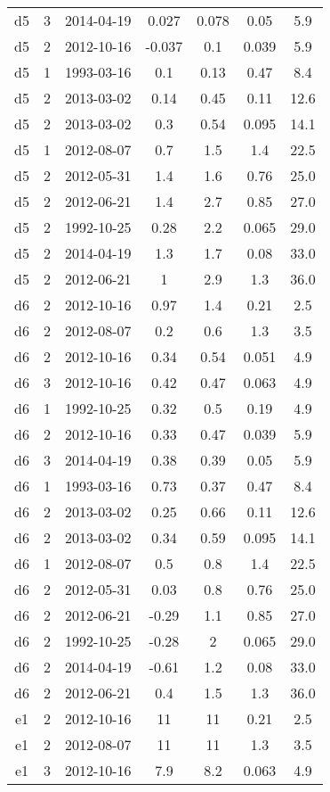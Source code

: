 \begin{table*}[htp]
\begin{tabular}{ccccccc}
d5 & 3 & 2014-04-19 & 0.027 & 0.078 & 0.05 & 5.9 \\
d5 & 2 & 2012-10-16 & -0.037 & 0.1 & 0.039 & 5.9 \\
d5 & 1 & 1993-03-16 & 0.1 & 0.13 & 0.47 & 8.4 \\
d5 & 2 & 2013-03-02 & 0.14 & 0.45 & 0.11 & 12.6 \\
d5 & 2 & 2013-03-02 & 0.3 & 0.54 & 0.095 & 14.1 \\
d5 & 1 & 2012-08-07 & 0.7 & 1.5 & 1.4 & 22.5 \\
d5 & 2 & 2012-05-31 & 1.4 & 1.6 & 0.76 & 25.0 \\
d5 & 2 & 2012-06-21 & 1.4 & 2.7 & 0.85 & 27.0 \\
d5 & 2 & 1992-10-25 & 0.28 & 2.2 & 0.065 & 29.0 \\
d5 & 2 & 2014-04-19 & 1.3 & 1.7 & 0.08 & 33.0 \\
d5 & 2 & 2012-06-21 & 1 & 2.9 & 1.3 & 36.0 \\
d6 & 2 & 2012-10-16 & 0.97 & 1.4 & 0.21 & 2.5 \\
d6 & 2 & 2012-08-07 & 0.2 & 0.6 & 1.3 & 3.5 \\
d6 & 2 & 2012-10-16 & 0.34 & 0.54 & 0.051 & 4.9 \\
d6 & 3 & 2012-10-16 & 0.42 & 0.47 & 0.063 & 4.9 \\
d6 & 1 & 1992-10-25 & 0.32 & 0.5 & 0.19 & 4.9 \\
d6 & 2 & 2012-10-16 & 0.33 & 0.47 & 0.039 & 5.9 \\
d6 & 3 & 2014-04-19 & 0.38 & 0.39 & 0.05 & 5.9 \\
d6 & 1 & 1993-03-16 & 0.73 & 0.37 & 0.47 & 8.4 \\
d6 & 2 & 2013-03-02 & 0.25 & 0.66 & 0.11 & 12.6 \\
d6 & 2 & 2013-03-02 & 0.34 & 0.59 & 0.095 & 14.1 \\
d6 & 1 & 2012-08-07 & 0.5 & 0.8 & 1.4 & 22.5 \\
d6 & 2 & 2012-05-31 & 0.03 & 0.8 & 0.76 & 25.0 \\
d6 & 2 & 2012-06-21 & -0.29 & 1.1 & 0.85 & 27.0 \\
d6 & 2 & 1992-10-25 & -0.28 & 2 & 0.065 & 29.0 \\
d6 & 2 & 2014-04-19 & -0.61 & 1.2 & 0.08 & 33.0 \\
d6 & 2 & 2012-06-21 & 0.4 & 1.5 & 1.3 & 36.0 \\
e1 & 2 & 2012-10-16 & 11 & 11 & 0.21 & 2.5 \\
e1 & 2 & 2012-08-07 & 11 & 11 & 1.3 & 3.5 \\
e1 & 3 & 2012-10-16 & 7.9 & 8.2 & 0.063 & 4.9 \\

\end{tabular}
\end{table*}
